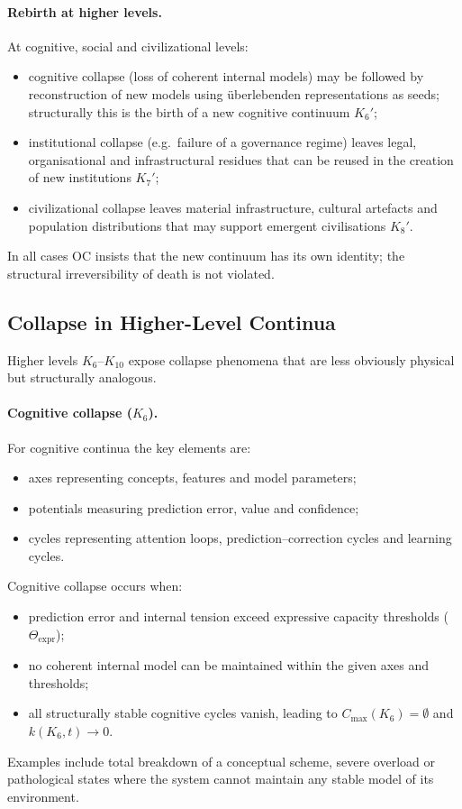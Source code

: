 \paragraph{Rebirth at higher levels.}
At cognitive, social and civilizational levels:
\begin{itemize}
  \item cognitive collapse (loss of coherent internal models) may be followed
        by reconstruction of new models using überlebenden representations as
        seeds; structurally this is the birth of a new cognitive continuum
        \(K_6'\);
  \item institutional collapse (e.g.\ failure of a governance regime) leaves
        legal, organisational and infrastructural residues that can be reused
        in the creation of new institutions \(K_7'\);
  \item civilizational collapse leaves material infrastructure, cultural
        artefacts and population distributions that may support emergent
        civilisations \(K_8'\).
\end{itemize}

In all cases OC insists that the new continuum has its own identity; the
structural irreversibility of death is not violated.

\subsection{Collapse in Higher-Level Continua}

Higher levels \(K_6\)–\(K_{10}\) expose collapse phenomena that are less
obviously physical but structurally analogous.

\paragraph{Cognitive collapse (\texorpdfstring{\(K_6\)}{K_6}).}
For cognitive continua the key elements are:
\begin{itemize}
  \item axes representing concepts, features and model parameters;
  \item potentials measuring prediction error, value and confidence;
  \item cycles representing attention loops, prediction--correction cycles
        and learning cycles.
\end{itemize}
Cognitive collapse occurs when:
\begin{itemize}
  \item prediction error and internal tension exceed expressive capacity
        thresholds (\(\Theta_{\mathrm{expr}}\));
  \item no coherent internal model can be maintained within the given axes
        and thresholds;
  \item all structurally stable cognitive cycles vanish, leading to
        \(C_{\max}(K_6)=\emptyset\) and \(k(K_6,t)\to 0\).
\end{itemize}
Examples include total breakdown of a conceptual scheme, severe overload or
pathological states where the system cannot maintain any stable model of its
environment.

